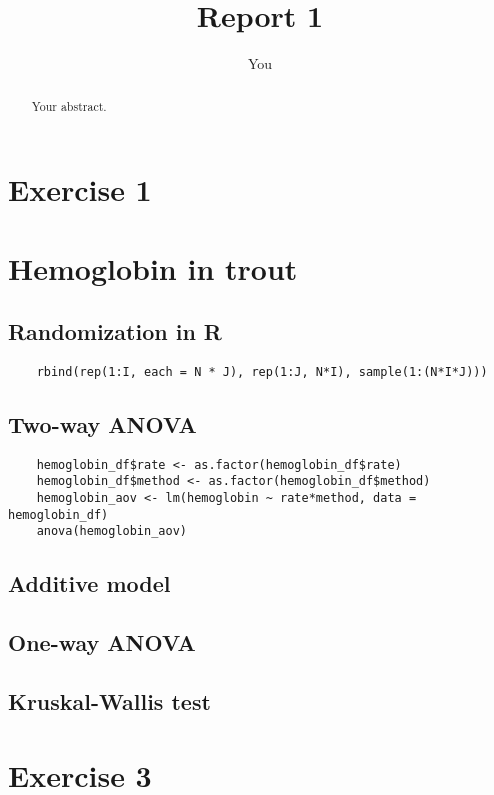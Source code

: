 \documentclass{article}
\title{Report 1}
\author{You}
\begin{document}
\maketitle

\begin{abstract}
Your abstract.
\end{abstract}

\section{Exercise 1}

\section{Hemoglobin in trout}

\subsection{Randomization in R}
\begin{lstlisting}
    rbind(rep(1:I, each = N * J), rep(1:J, N*I), sample(1:(N*I*J)))
\end{lstlisting}

\subsection{Two-way ANOVA}
\begin{lstlisting}
    hemoglobin_df$rate <- as.factor(hemoglobin_df$rate) 
    hemoglobin_df$method <- as.factor(hemoglobin_df$method)
    hemoglobin_aov <- lm(hemoglobin ~ rate*method, data = hemoglobin_df)
    anova(hemoglobin_aov)   
\end{lstlisting}

\subsection{Additive model}

\subsection{One-way ANOVA}

\subsection{Kruskal-Wallis test}


\section{Exercise 3}




\end{document}

